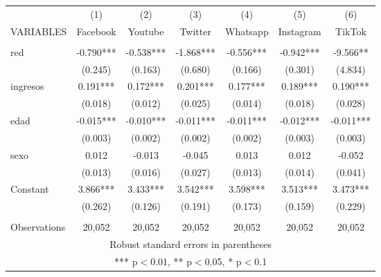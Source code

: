 \begin{tabular}{lcccccc} \hline
 & (1) & (2) & (3) & (4) & (5) & (6) \\
VARIABLES & Facebook & Youtube & Twitter & Whatsapp & Instagram & TikTok \\ \hline
 &  &  &  &  &  &  \\
red & -0.790*** & -0.538*** & -1.868*** & -0.556*** & -0.942*** & -9.566** \\
 & (0.245) & (0.163) & (0.680) & (0.166) & (0.301) & (4.834) \\
ingresos & 0.191*** & 0.172*** & 0.201*** & 0.177*** & 0.189*** & 0.190*** \\
 & (0.018) & (0.012) & (0.025) & (0.014) & (0.018) & (0.028) \\
edad & -0.015*** & -0.010*** & -0.011*** & -0.011*** & -0.012*** & -0.011*** \\
 & (0.003) & (0.002) & (0.002) & (0.002) & (0.003) & (0.003) \\
sexo & 0.012 & -0.013 & -0.045 & 0.013 & 0.012 & -0.052 \\
 & (0.013) & (0.016) & (0.027) & (0.013) & (0.014) & (0.041) \\
Constant & 3.866*** & 3.433*** & 3.542*** & 3.598*** & 3.513*** & 3.473*** \\
 & (0.262) & (0.126) & (0.191) & (0.173) & (0.159) & (0.229) \\
 &  &  &  &  &  &  \\
 Observations & 20,052 & 20,052 & 20,052 & 20,052 & 20,052 & 20,052 \\ \hline
\multicolumn{7}{c}{ Robust standard errors in parentheses} \\
\multicolumn{7}{c}{ *** p$<$0.01, ** p$<$0.05, * p$<$0.1} \\
\end{tabular}
